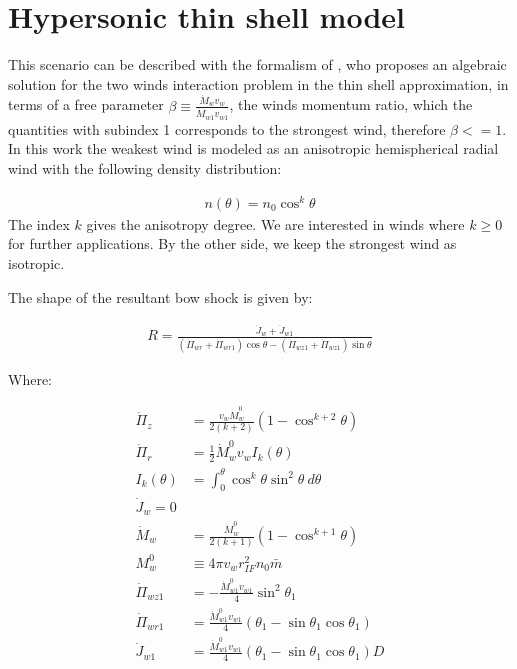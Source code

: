 \newcommand\thC{\(\theta^1\)\,Ori~C}
\newcommand\CRW{\citetalias{Canto:1996}}

\section{Hypersonic thin shell model}
\label{sec:crw-scenario}
This scenario can be described with the formalism of
\citet[][hereafter \CRW{}]{Canto:1996}, who proposes an algebraic
solution for the two winds interaction problem in the thin shell
approximation, in terms of a free parameter
$\beta\equiv\frac{\dot{M}_wv_w}{\dot{M}_{w1}v_{w1}}$, the winds
momentum ratio, which the quantities with subindex 1 corresponds to
the strongest wind, therefore $\beta<=1$. In this work the weakest wind is modeled as an anisotropic hemispherical radial wind
with the following density distribution:

\begin{align}
  n(\theta) = n_0\cos^k\theta
\end{align}  
The index $k$ gives the anisotropy degree. We are interested in winds where $k \geq 0$ for further applications. By the other side, we keep the strongest
wind as isotropic.

The shape of the resultant bow shock is given by:

\begin{align}
  R = \frac{\dot{J}_w + \dot{J}_{w1}}{\left(\dot{\Pi}_{wr}+\dot{\Pi}_{wr1}\right)\cos\theta-\left(\dot{\Pi}_{wz1}+\dot{\Pi}_{wz1}\right)\sin\theta}
  \label{eq:Rmom}
\end{align}

Where:

\begin{align}
\dot{\Pi}_z &= \frac{v_w\dot{M}_w^0}{2(k+2)}\left(1-\cos^{k+2}\theta\right)  \label{eq:pir}\\
\dot{\Pi}_r &= \frac{1}{2}\dot{M}^0_w v_w I_k (\theta) \label{eq:piz}\\
I_k(\theta) & = \int^\theta_0 \cos^k \theta \sin^2\theta~d\theta \label{eq:Ik}\\
\dot{J}_w = 0 \label{eq:jdot} \\
\dot{M}_w &= \frac{\dot{M}_w^0}{2(k+1)}\left(1-\cos^{k+1}\theta\right) \label{eq:dotprop} \\
M^0_w &\equiv 4\pi v_w r^2_{IF} n_0 \bar{m}\\
\dot{\Pi}_{wz1} & = -\frac{\dot{M}^0_{w1}v_{w1}}{4}\sin^2\theta_1\\
\dot{\Pi}_{wr1} & = \frac{\dot{M}^0_{w1}v_{w1}}{4}\left(\theta_1-\sin\theta_1\cos\theta_1\right)\\
\dot{J}_{w1} & = \frac{\dot{M}^0_{w1}v_{w1}}{4}\left(\theta_1-\sin\theta_1\cos\theta_1\right)D \label{eq:jdot1}
\end{align}

